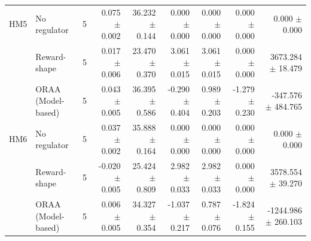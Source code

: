 \begin{tabular}{llrrrrrrr}
\addlinespace
HM5 & No regulator & 5 & 0.075 $\pm$ 0.002 & 36.232 $\pm$ 0.144 & 0.000 $\pm$ 0.000 & 0.000 $\pm$ 0.000 & 0.000 $\pm$ 0.000 & 0.000 $\pm$ 0.000 \\
 & Reward-shape & 5 & 0.017 $\pm$ 0.006 & 23.470 $\pm$ 0.370 & 3.061 $\pm$ 0.015 & 3.061 $\pm$ 0.015 & 0.000 $\pm$ 0.000 & 3673.284 $\pm$ 18.479 \\
 & ORAA (Model-based) & 5 & 0.043 $\pm$ 0.005 & 36.395 $\pm$ 0.586 & -0.290 $\pm$ 0.404 & 0.989 $\pm$ 0.203 & -1.279 $\pm$ 0.230 & -347.576 $\pm$ 484.765 \\
\addlinespace
HM6 & No regulator & 5 & 0.037 $\pm$ 0.002 & 35.888 $\pm$ 0.164 & 0.000 $\pm$ 0.000 & 0.000 $\pm$ 0.000 & 0.000 $\pm$ 0.000 & 0.000 $\pm$ 0.000 \\
 & Reward-shape & 5 & -0.020 $\pm$ 0.005 & 25.424 $\pm$ 0.809 & 2.982 $\pm$ 0.033 & 2.982 $\pm$ 0.033 & 0.000 $\pm$ 0.000 & 3578.554 $\pm$ 39.270 \\
 & ORAA (Model-based) & 5 & 0.006 $\pm$ 0.005 & 34.327 $\pm$ 0.354 & -1.037 $\pm$ 0.217 & 0.787 $\pm$ 0.076 & -1.824 $\pm$ 0.155 & -1244.986 $\pm$ 260.103 \\
\bottomrule
\end{tabular}
